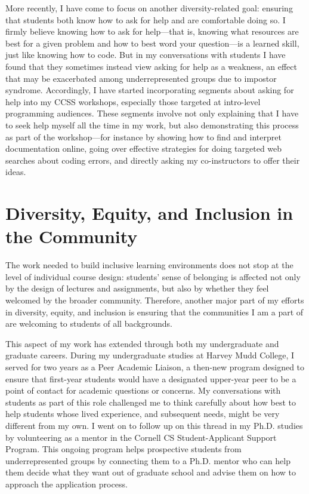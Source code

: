 \documentclass[12pt,letterpaper]{article}
\begin{document}
More recently, I have come to focus on another diversity-related goal: ensuring that students both know how to ask for help and are comfortable doing so.
I firmly believe knowing how to ask for help---that is, knowing what resources are best for a given problem and how to best word your question---is a learned skill, just like knowing how to code.
But in my conversations with students I have found that they sometimes instead view asking for help as a weakness, an effect that may be exacerbated among underrepresented groups due to impostor syndrome.
Accordingly, I have started incorporating segments about asking for help into my CCSS workshops, especially those targeted at intro-level programming audiences.
These segments involve not only explaining that I have to seek help myself all the time in my work, but also demonstrating this process as part of the workshop---for instance by showing how to find and interpret documentation online, going over effective strategies for doing targeted web searches about coding errors, and directly asking my co-instructors to offer their ideas.

\section{Diversity, Equity, and Inclusion in the Community}
The work needed to build inclusive learning environments does not stop at the level of individual course design: students' sense of belonging is affected not only by the design of lectures and assignments, but also by whether they feel welcomed by the broader community.
Therefore, another major part of my efforts in diversity, equity, and inclusion is ensuring that the communities I am a part of are welcoming to students of all backgrounds.

This aspect of my work has extended through both my undergraduate and graduate careers.
During my undergraduate studies at Harvey Mudd College, I served for two years as a Peer Academic Liaison, a then-new program designed to ensure that first-year students would have a designated upper-year peer to be a point of contact for academic questions or concerns.
My conversations with students as part of this role challenged me to think carefully about how best to help students whose lived experience, and subsequent needs, might be very different from my own.
I went on to follow up on this thread in my Ph.D. studies by volunteering as a mentor in the Cornell CS Student-Applicant Support Program.
This ongoing program helps prospective students from underrepresented groups by connecting them to a Ph.D. mentor who can help them decide what they want out of graduate school and advise them on how to approach the application process.
\end{document}
